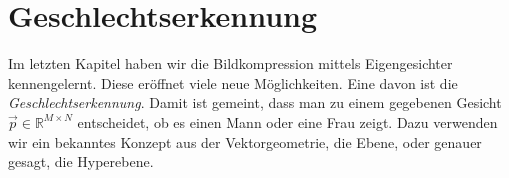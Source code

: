 \section{Geschlechtserkennung} \label{sec:binary}
Im letzten Kapitel haben wir die Bildkompression mittels Eigengesichter kennengelernt.
Diese eröffnet viele neue Möglichkeiten.
Eine davon ist die \textit{Geschlechtserkennung}.
Damit ist gemeint, dass man zu einem gegebenen Gesicht $\vec p\in\mathbb R^{M\times N}$ entscheidet, ob es einen Mann oder eine Frau zeigt.
Dazu verwenden wir ein bekanntes Konzept aus der Vektorgeometrie, die Ebene, oder genauer gesagt, die Hyperebene.